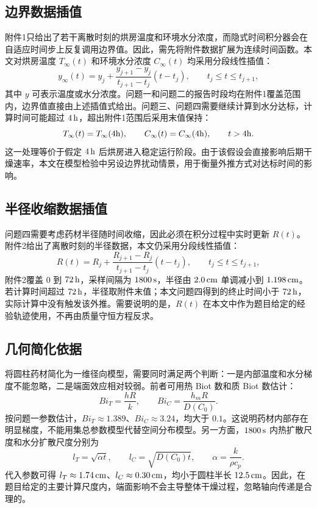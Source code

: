 \documentclass[UTF8,a4paper,12pt]{ctexart}
\numberwithin{equation}{section}
\begin{document}
\subsection{边界数据插值}
附件1只给出了若干离散时刻的烘房温度和环境水分浓度，而隐式时间积分器会在自适应时间步上反复调用边界值。因此，需先将附件数据扩展为连续时间函数。本文对烘房温度 $T_\infty(t)$ 和环境水分浓度 $C_\infty(t)$ 均采用分段线性插值：
\begin{equation}
  y_\infty(t)=y_j+\frac{y_{j+1}-y_j}{t_{j+1}-t_j}(t-t_j),
  \qquad t_j\le t\le t_{j+1},
\end{equation}
其中 $y$ 可表示温度或水分浓度。问题一和问题二的报告时段均在附件1覆盖范围内，边界值直接由上述插值式给出。问题三、问题四需要继续计算到水分达标，计算时间可能超过 $4\rm\,h$，超出附件1范围后采用末值保持：
\begin{equation}
  T_\infty(t)=T_\infty(4{\rm h}),\qquad C_\infty(t)=C_\infty(4{\rm h}),\qquad t>4{\rm h}.
\end{equation}
这一处理等价于假定 $4\rm\,h$ 后烘房进入稳定运行阶段。由于该假设会直接影响后期干燥速率，本文在模型检验中另设边界扰动情景，用于衡量外推方式对达标时间的影响。

\subsection{半径收缩数据插值}
问题四需要考虑药材半径随时间收缩，因此必须在积分过程中实时更新 $R(t)$。附件2给出了离散时刻的半径数据，本文仍采用分段线性插值：
\begin{equation}
  R(t)=R_j+\frac{R_{j+1}-R_j}{t_{j+1}-t_j}(t-t_j),
  \qquad t_j\le t\le t_{j+1},
\end{equation}
附件2覆盖 $0$ 到 $72\rm\,h$，采样间隔为 $1800\rm\,s$，半径由 $2.0\rm\,cm$ 单调减小到 $1.198\rm\,cm$。若计算时间超过 $72\rm\,h$，半径取附件末值；本文问题四得到的终止时间小于 $72\rm\,h$，实际计算中没有触发该外推。需要说明的是，$R(t)$ 在本文中作为题目给定的经验轨迹使用，不再由质量守恒方程反求。

\subsection{几何简化依据}
将圆柱药材简化为一维径向模型，需要同时满足两个判断：一是内部温度和水分梯度不能忽略，二是端面效应相对较弱。前者可用热 Biot 数和质 Biot 数估计：
\begin{equation}
  Bi_T=\frac{hR}{k},\qquad Bi_C=\frac{h_mR}{D(C_0)}.
\end{equation}
按问题一参数估计，$Bi_T\approx1.389$、$Bi_C\approx3.24$，均大于 $0.1$。这说明药材内部存在明显梯度，不能用集总参数模型代替空间分布模型。另一方面，$1800\rm\,s$ 内热扩散尺度和水分扩散尺度分别为
\begin{equation}
  l_T=\sqrt{\alpha t},\qquad l_C=\sqrt{D(C_0)t},\qquad \alpha=\frac{k}{\rho c_p}.
\end{equation}
代入参数可得 $l_T\approx1.74\rm\,cm$、$l_C\approx0.30\rm\,cm$，均小于圆柱半长 $12.5\rm\,cm$。因此，在题目给定的主要计算尺度内，端面影响不会主导整体干燥过程，忽略轴向传递是合理的。
\end{document}
